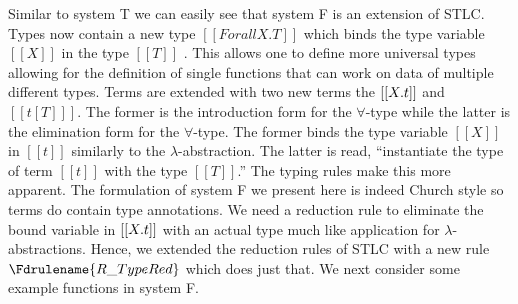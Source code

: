 Similar to system T we can easily see that system F is an extension of
STLC.  Types now contain a new type $[[Forall X.T]]$ which binds the
type variable $[[X]]$ in the type $[[T]]$
.  This allows one to define more
universal types allowing for the definition of single functions that
can work on data of multiple different types.  Terms are extended with
two new terms the $[[\\X.t]]$ and $[[t [T] ]]$.  The former is the
introduction form for the $\forall$-type while the latter is the
elimination form for the $\forall$-type. The former binds the type
variable $[[X]]$ in $[[t]]$ similarly to the
$\lambda$-abstraction. The latter is read, ``instantiate the type of
term $[[t]]$ with the type $[[T]]$.''  The typing rules make this more
apparent.  The formulation of system F we present here is indeed
Church style so terms do contain type annotations.  We need a
reduction rule to eliminate the bound variable in $[[\\X.t]]$ with an
actual type much like application for $\lambda$-abstractions.  Hence,
we extended the reduction rules of STLC with a new rule
$\Fdrulename{\normalsize R\_TypeRed}$ which does just that.  We next consider some
example functions in system F.


